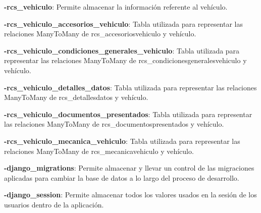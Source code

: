 \textbf{-rcs\_vehiculo}: Permite almacenar la información referente al vehículo.

\textbf{-rcs\_vehiculo\_accesorios\_vehiculo}: Tabla utilizada para representar las relaciones ManyToMany de rcs\_accesoriosvehiculo y vehículo.

\textbf{-rcs\_vehiculo\_condiciones\_generales\_vehiculo}: Tabla utilizada para representar las relaciones ManyToMany de rcs\_condicionesgeneralesvehiculo y vehículo.

\textbf{-rcs\_vehiculo\_detalles\_datos}: Tabla utilizada para representar las relaciones ManyToMany de rcs\_detallesdatos y vehículo.

\textbf{-rcs\_vehiculo\_documentos\_presentados}: Tabla utilizada para representar las relaciones ManyToMany de rcs\_documentospresentados y vehículo.

\textbf{-rcs\_vehiculo\_mecanica\_vehiculo}: Tabla utilizada para representar las relaciones ManyToMany de rcs\_mecanicavehiculo y vehículo.

\textbf{-django\_migrations}: Permite almacenar y llevar un control de las migraciones aplicadas para cambiar la base de datos a lo largo del proceso de desarrollo.

\textbf{-django\_session}: Permite almacenar todos los valores usados en la sesión de los usuarios dentro de la aplicación.


\setlength{\parskip}{0mm}



\setlength{\parskip}{0mm}


